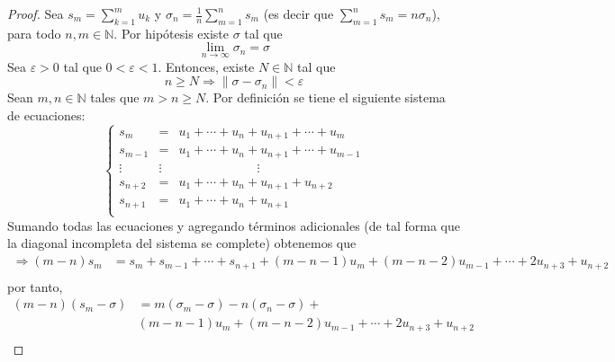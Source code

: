 \documentclass[12pt]{report}
\theoremstyle{largebreak}
\renewcommand{\geq}{\ensuremath{\geqslant}}
\newcommand\norm[1]{\ensuremath{\|#1\|}}
\begin{document}
    \begin{proof}
        Sea $s_m=\sum_{ k=1}^m u_k$ y $\sigma_n=\frac{1}{n}\sum_{ m=1}^n s_m$ (es decir que $\sum_{ m=1}^n s_m=n\sigma_n$), para todo $n,m\in\mathbb{N}$. Por hipótesis existe $\sigma$ tal que
        \begin{equation*}
            \lim_{ n\rightarrow\infty}\sigma_n=\sigma
        \end{equation*}
        Sea $\varepsilon>0$ tal que $0<\varepsilon<1$. Entonces, existe $N\in\mathbb{N}$ tal que
        \begin{equation*}
            n\geq N\Rightarrow\norm{\sigma-\sigma_n}<\varepsilon
        \end{equation*}
        Sean $m,n\in\mathbb{N}$ tales que $m>n\geq N$. Por definición se tiene el siguiente sistema de ecuaciones:
        \begin{equation*}
            \left\{\begin{array}{rcl}
                s_m&=&u_1+\cdots+u_n+u_{ n+1}+\cdots+u_m\\
                s_{ m-1}&=&u_1+\cdots+u_n+u_{ n+1}+\cdots+u_{ m-1}\\
                \vdots\:\:\:\: & \vdots & \quad\quad\quad\quad\quad\quad\: \vdots \\
                s_{ n+2}&=&u_1+\cdots+u_n+u_{ n+1}+u_{ n+2}\\
                s_{ n+1}&=&u_1+\cdots+u_n+u_{ n+1}\\
            \end{array}\right.
        \end{equation*}
        Sumando todas las ecuaciones y agregando términos adicionales (de tal forma que la diagonal incompleta del sistema se complete) obtenemos que
        \begin{equation*}
            \begin{split}
                \Rightarrow (m-n)s_m&=s_m+s_{ m-1}+\cdots+s_{ n+1}+(m-n-1)u_m+(m-n-2)u_{ m-1}+\cdots+2u_{ n+3}+u_{ n+2}\\
            \end{split}
        \end{equation*}
        por tanto,
        \begin{equation*}
            \begin{split}
                (m-n)(s_m-\sigma)&=m(\sigma_m-\sigma)-n(\sigma_n-\sigma)+\\
                &(m-n-1)u_m+(m-n-2)u_{ m-1}+\cdots+2u_{ n+3}+u_{ n+2}\\
            \end{split}

\end{equation*}
\end{proof}
\end{document}
